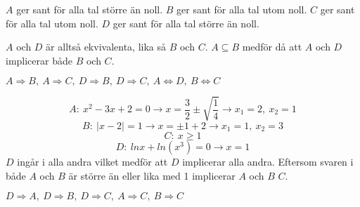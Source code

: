\begin{task}{1.6}
	$A$ ger sant för alla tal större än noll. $B$ ger sant för alla tal utom noll. $C$ ger sant för alla tal utom noll. $D$ ger sant för alla tal större än noll. 
	
	$A$ och $D$ är alltså ekvivalenta, lika så $B$ och $C$. $A\subseteq B$ medför då att $A$ och $D$ implicerar både $B$ och $C$.
	
	\ans $A \Rightarrow B,~ A \Rightarrow C,~ D \Rightarrow B,~ D \Rightarrow C,~ A \Leftrightarrow D,~ B \Leftrightarrow C$
\end{task}

\begin{task}{1.7}
	\[A:~x^2-3x+2=0 \rightarrow x = \frac{3}{2} \pm \sqrt{\frac{1}{4}} \rightarrow x_1 = 2,~x_2 = 1\]
	\[B:~|x-2|=1 \rightarrow x=\pm 1+2 \rightarrow x_1=1,~x_2=3\]
	\[C:~x \ge 1\]
	\[D:~lnx + ln(x^3) = 0 \rightarrow x=1\]
	$D$ ingår i alla andra vilket medför att $D$ implicerar alla andra. Eftersom svaren i både $A$ och $B$ är större än eller lika med 1 implicerar $A$ och $B$ $C$.
	
	\ans $D \Rightarrow A,~ D \Rightarrow B,~ D \Rightarrow C,~ A \Rightarrow C,~ B \Rightarrow C$
	
\end{task}